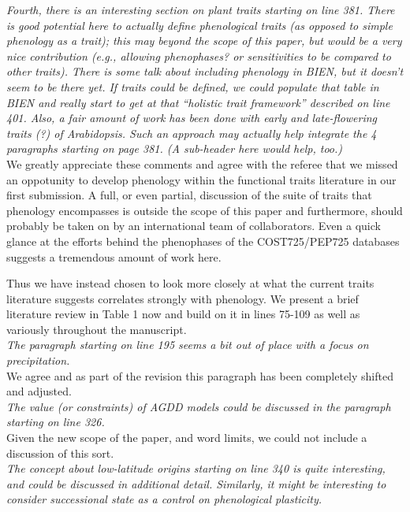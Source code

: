 \documentclass[11pt,a4paper]{letter}
\begin{document}
\begin{letter}{}
\emph{Fourth, there is an interesting section on plant traits starting on line 381. There is good potential here to actually define phenological traits (as opposed to simple phenology as a trait); this may beyond the scope of this paper, but would be a very nice contribution (e.g., allowing phenophases? or sensitivities to be compared to other traits). There is some talk about including phenology in BIEN, but it doesn't seem to be there yet. If traits could be defined, we could populate that table in BIEN and really start to get at that ``holistic trait framework'' described on line 401. Also, a fair amount of work has been done with early and late-flowering traits (?) of Arabidopsis. Such an approach may actually help integrate the 4 paragraphs starting on page 381. (A sub-header here would help, too.) } \\ 

We greatly appreciate these comments and agree with the referee that we missed an oppotunity to develop phenology within the functional traits literature in our first submission. A full, or even partial, discussion of the suite of traits that phenology encompasses is outside the scope of this paper and furthermore, should probably be taken on by an international team of collaborators. Even a quick glance at the efforts behind the phenophases of the COST725/PEP725 databases suggests a tremendous amount of work here. 

Thus we have instead chosen to look more closely at what the current traits literature suggests correlates strongly with phenology. We present a brief literature review in Table 1 now and build on it in lines 75-109 as well as variously throughout the manuscript.\\

\emph{The paragraph starting on line 195 seems a bit out of place with a focus on precipitation. }\\

We agree and as part of the revision this paragraph has been completely shifted and adjusted.\\

\emph{The value (or constraints) of AGDD models could be discussed in the paragraph starting on line 326.}\\

Given the new scope of the paper, and word limits, we could not include a discussion of this sort.\\ 

\emph{The concept about low-latitude origins starting on line 340 is quite interesting, and could be discussed in additional detail. Similarly, it might be interesting to consider successional state as a control on phenological plasticity. }\\


\end{letter}
\end{document}
